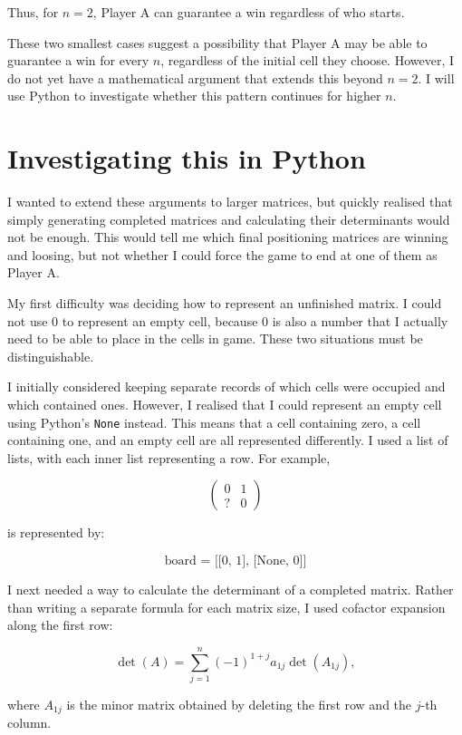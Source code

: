 \documentclass[11pt]{article}
\newcommand{\keywordfont}{\textsc}
\newcommand{\keyword}[1]{%
  \marginpar{\raggedright\small\keywordfont{#1}}}
\begin{document}
Thus, for $n=2$, Player A can guarantee a win regardless of who starts.

\keyword{Conjecture}
These two smallest cases suggest a possibility that Player A may be able to guarantee a win for every $n$, regardless of the initial cell they choose. However, I do not yet have a mathematical argument that extends this beyond $n=2$. I will use Python to investigate whether this pattern continues for higher $n$.

\section*{Investigating this in Python}

I wanted to extend these arguments to larger matrices, but quickly realised that simply generating completed matrices and calculating their determinants would not be enough. This would tell me which final positioning matrices are winning and loosing, but not whether I could force the game to end at one of them as Player A.

\keyword{STUCK} My first difficulty was deciding how to represent an unfinished matrix. I could not use $0$ to represent an empty cell, because $0$ is also a number that I actually need to be able to place in the cells in game. These two situations must be distinguishable.

\keyword{AHA} I initially considered keeping separate records of which cells were occupied and which contained ones. However, I realised that I could represent an empty cell using Python's \texttt{None} instead. This means that a cell containing zero, a cell containing one, and an empty cell are all represented differently. I used a list of lists, with each inner list representing a row. For example,

$$
\begin{pmatrix}
0&1\\
?&0
\end{pmatrix}
$$


is represented by:

$$\text{board = [[0, 1], [None, 0]]}$$


I next needed a way to calculate the determinant of a completed matrix. Rather than writing a separate formula for each matrix size, I used cofactor expansion along the first row:

$$
\det(A)=\sum_{j=1}^{n}(-1)^{1+j}a_{1j}\det(A_{1j}),
$$

where $A_{1j}$ is the minor matrix obtained by deleting the first row and the $j$-th column.
\end{document}
